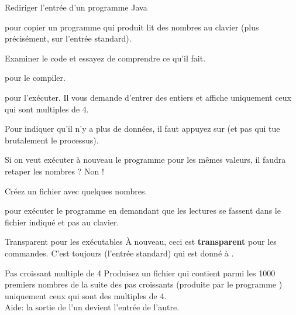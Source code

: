 \documentclass[a4paper,11pt]{style-esi/td}
\begin{document}
		\begin{Experience}{Rediriger l'entrée d'un programme Java}
			\begin{steps}
			\item 
				pour copier un programme  qui produit lit des nombres
				au clavier (plus précisément, sur l'entrée standard).
			\item 
				Examiner le code et essayez de comprendre ce qu'il fait.
			\item 
				 pour le compiler.
			\item 
				 pour l'exécuter.
				Il vous demande d'entrer des entiers et affiche
				uniquement ceux qui sont multiples de 4.
			\item 
				Pour indiquer qu'il n'y a plus de données,
				il faut appuyez sur 
				(et pas  qui tue brutalement le processus).
			\end{steps}
			Si on veut exécuter à nouveau le programme pour les mêmes valeurs,
			il faudra retaper les nombres ? Non !
			\begin{steps}
			\item 
				Créez un fichier  avec quelques nombres.
			\item 
				 pour exécuter
				le programme en demandant que les lectures se fassent
				dans le fichier indiqué et pas au clavier.
			\end{steps}
		\end{Experience}	

		\medskip
		\begin{alerttbox}{Transparent pour les exécutables}
			À nouveau, ceci est \textbf{transparent} pour les commandes.
			C'est toujours  (l'entrée standard) 
			qui est donné à .
		\end{alerttbox}

		\begin{Exercice}{Pas croissant multiple de 4 }
			Produisez un fichier 
			qui contient parmi les 1000 premiers nombres de la suite
			des pas croissants (produite par le programme )
			uniquement ceux qui sont des multiples de 4.
			\\Aide: la sortie de l'un devient l'entrée de l'autre.
		\end{Exercice}
\end{document}

